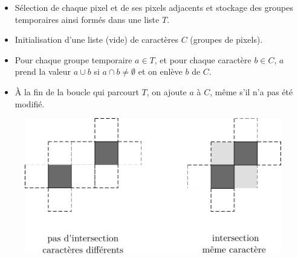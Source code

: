 \clearpage
{}

\begin{slide}

	\begin{itemize}

		\item Sélection de chaque pixel et de ses pixels adjacents et stockage des groupes temporaires ainsi formés dans une liste $T$.
		\item Initialisation d'une liste (vide) de caractères $C$ (groupes de pixels).
		\item Pour chaque groupe temporaire $a \in T$, et pour chaque caractère $b \in C$, $a$ prend la valeur $a\cup b$ si $a\cap b \neq \emptyset$ et on enlève $b$ de $C$. 
		\item À la fin de la boucle qui parcourt $T$, on ajoute $a$ à $C$, même s'il n'a pas été modifié.

	\end{itemize}

	\begin{figure}[h!]
		\centering
		\includegraphics[width=0.8\linewidth]{schemas/algo_sep2.pdf}
	\end{figure}


\end{slide}